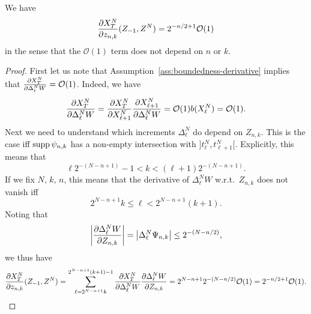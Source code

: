 \begin{lemma}
  \label{lem:dXdZ}
  We have
  \begin{equation*}
    \frac{\partial X^N_T}{\partial z_{n,k}}(Z_{-1}, Z^N) = 2^{-n/2+1} \mathcal{O}(1)
  \end{equation*}
  in the sense that the $\mathcal{O}(1)$ term does not depend on $n$ or $k$.
\end{lemma}
\begin{proof}
  First let us note that Assumption~\ref{ass:boundedness-derivative} implies
  that $\frac{\partial X^N_T}{\partial \Delta^N_\ell W} = \mathcal{O}(1)$. Indeed, we have
  \begin{equation*}
    \frac{\partial X^N_T}{\partial \Delta^N_\ell W} = \frac{\partial X^N_T}{\partial X^N_{\ell+1}}
    \frac{\partial X^N_{\ell+1}}{\partial \Delta^N_\ell W} = \mathcal{O}(1) b(X^N_\ell) =
    \mathcal{O}(1).
  \end{equation*}
  Next we need to understand which increments $\Delta^N_\ell$ do depend on
  $Z_{n,k}$. This is the case iff $\operatorname{supp} \psi_{n,k}$ has a non-empty
  intersection with $]t^N_{\ell}, t^N_{\ell+1}[$. Explicitly, this means that
  \begin{equation*}
    \ell 2^{-(N-n+1)} -1 < k < (\ell+1) 2^{-(N-n+1)}.
  \end{equation*}
  If we fix $N$, $k$, $n$, this means that the derivative of $\Delta^N_\ell W$
  w.r.t.~$Z_{n,k}$ does not vanish iff
  \begin{equation*}
    2^{N-n+1} k \le \ell < 2^{N-n+1} (k+1).
  \end{equation*}
  Noting that
  \begin{equation}\label{eq:dWdZ}
    \left\lvert\frac{\partial \Delta^N_\ell W}{\partial Z_{n,k}}\right\rvert = \left\lvert\Delta^N_\ell \Psi_{n,k}\right\rvert
    \le 2^{-(N-n/2)},
  \end{equation}
  we thus have
  \begin{equation}
    \label{eq:2}
    \frac{\partial X^N_T}{\partial z_{n,k}}(Z_{-1}, Z^N) =
    \sum_{\ell=2^{N-n+1}k}^{2^{N-n+1}(k+1)-1} \frac{\partial X^N_T}{\partial \Delta^N_\ell
      W} \frac{\partial \Delta^N_\ell W}{\partial Z_{n,k}} = 2^{N-n+1} 2^{-(N-n/2)}
    \mathcal{O}(1) = 2^{-n/2+1} \mathcal{O}(1).\qedhere
  \end{equation}
\end{proof}

